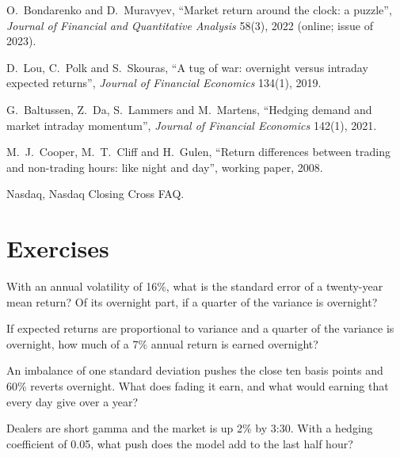 \begin{omsources}
\item O.~Bondarenko and D.~Muravyev, ``Market return around the clock: a puzzle'', \emph{Journal of Financial and Quantitative Analysis} 58(3), 2022 (online; issue of 2023).
\item D.~Lou, C.~Polk and S.~Skouras, ``A tug of war: overnight versus intraday expected returns'', \emph{Journal of Financial Economics} 134(1), 2019.
\item G.~Baltussen, Z.~Da, S.~Lammers and M.~Martens, ``Hedging demand and market intraday momentum'', \emph{Journal of Financial Economics} 142(1), 2021.
\item M.~J.~Cooper, M.~T.~Cliff and H.~Gulen, ``Return differences between trading and non-trading hours: like night and day'', working paper, 2008.
\item Nasdaq, Nasdaq Closing Cross FAQ.
\end{omsources}

\section{Exercises}

\begin{exercise}[$\star$]\label{exo:s1:intraday-patterns:1}
With an annual volatility of 16\%, what is the standard error of a twenty-year mean return? Of its overnight part, if a quarter of the variance is overnight?
\end{exercise}

\begin{exercise}[$\star$]\label{exo:s1:intraday-patterns:2}
If expected returns are proportional to variance and a quarter of the variance is overnight, how much of a 7\% annual return is earned overnight?
\end{exercise}

\begin{exercise}[$\star$]\label{exo:s1:intraday-patterns:3}
An imbalance of one standard deviation pushes the close ten basis points and 60\% reverts overnight. What does fading it earn, and what would earning that
every day give over a year?
\end{exercise}

\begin{exercise}[$\star\star$]\label{exo:s1:intraday-patterns:4}
Dealers are short gamma and the market is up 2\% by 3:30. With a hedging coefficient of 0.05, what push does the model add to the last half hour?
\end{exercise}

